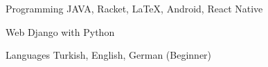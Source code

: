 


\begin{cvskills}


\cvskill
{Programming} %
{JAVA, Racket, LaTeX, Android, React Native} %


\cvskill
{Web} %
{Django with Python} %


\cvskill
{Languages} %
{Turkish, English, German (Beginner)} %


\end{cvskills}
